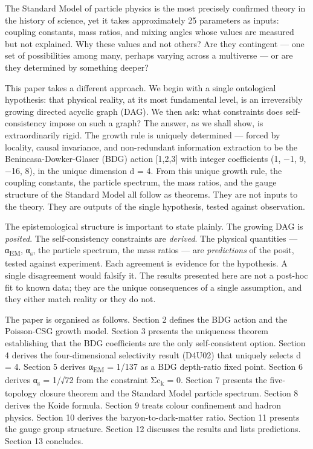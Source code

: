 \documentclass[12pt,a4paper]{article}
\begin{document}
The Standard Model of particle physics is the most precisely confirmed
theory in the history of science, yet it takes approximately 25
parameters as inputs: coupling constants, mass ratios, and mixing angles
whose values are measured but not explained. Why these values and not
others? Are they contingent --- one set of possibilities among many,
perhaps varying across a multiverse --- or are they determined by
something deeper?

This paper takes a different approach. We begin with a single
ontological hypothesis: that physical reality, at its most fundamental
level, is an irreversibly growing directed acyclic graph (DAG). We then
ask: what constraints does self-consistency impose on such a graph? The
answer, as we shall show, is extraordinarily rigid. The growth rule is
uniquely determined --- forced by locality, causal invariance, and
non-redundant information extraction to be the Benincasa-Dowker-Glaser
(BDG) action {[}1,2,3{]} with integer coefficients (1, −1, 9, −16, 8),
in the unique dimension d = 4. From this unique growth rule, the
coupling constants, the particle spectrum, the mass ratios, and the
gauge structure of the Standard Model all follow as theorems. They are
not inputs to the theory. They are outputs of the single hypothesis,
tested against observation.

The epistemological structure is important to state plainly. The growing
DAG is \emph{posited}. The self-consistency constraints are
\emph{derived}. The physical quantities --- α\textsubscript{EM},
α\textsubscript{s}, the particle spectrum, the mass ratios --- are
\emph{predictions} of the posit, tested against experiment. Each
agreement is evidence for the hypothesis. A single disagreement would
falsify it. The results presented here are not a post-hoc fit to known
data; they are the unique consequences of a single assumption, and they
either match reality or they do not.

The paper is organised as follows. Section 2 defines the BDG action and
the Poisson-CSG growth model. Section 3 presents the uniqueness theorem
establishing that the BDG coefficients are the only self-consistent
option. Section 4 derives the four-dimensional selectivity result
(D4U02) that uniquely selects d = 4. Section 5 derives
α\textsubscript{EM} = 1/137 as a BDG depth-ratio fixed point. Section 6
derives α\textsubscript{s} = 1/√72 from the constraint
Σc\textsubscript{k} = 0. Section 7 presents the five-topology closure
theorem and the Standard Model particle spectrum. Section 8 derives the
Koide formula. Section 9 treats colour confinement and hadron physics.
Section 10 derives the baryon-to-dark-matter ratio. Section 11 presents
the gauge group structure. Section 12 discusses the results and lists
predictions. Section 13 concludes.
\end{document}
